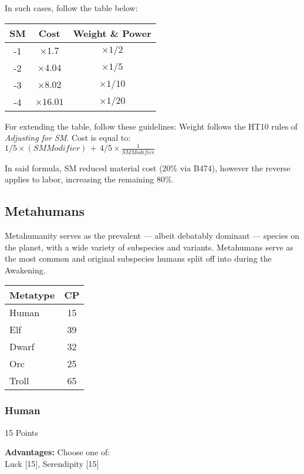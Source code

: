 \begin{multicols*}{3}
	In such cases, follow the table below:
	
	\begin{center}
		\begin{tabular}{|c|c|c|}
			\hline
			SM & Cost & Weight \& Power \\
			\hline
			\hline
			-1 & $\times1.7$ & $\times1/2$ \\
			-2 & $\times4.04$ & $\times1/5$ \\
			-3 & $\times8.02$ & $\times1/10$ \\
			-4 & $\times16.01$ & $\times1/20$ \\
			\hline
		\end{tabular}
	\end{center}

	For extending the table, follow these guidelines: Weight follows the HT10 rules of \textit{Adjusting for SM}. Cost is equal to:\\ $1/5\times(SM Modifier)\,+\,4/5\times\frac{1}{SM Modifier}$
	
	In said formula, SM reduced material cost (20\% via B474), however the reverse applies to labor, increasing the remaining 80\%.
	
	\subsection{Metahumans}
	
	Metahumanity serves as the prevalent — albeit debatably dominant — species on the planet, with a wide variety of subspecies and variants. Metahumans serve as the most common and original subspecies humans split off into during the Awakening.
	
	\begin{center}
		\begin{tabularx}{0.32\textwidth}{|X|c|}
			\hline
			Metatype & CP \\
			\hline
			\hline
			Human & 15 \\
			Elf & 39 \\
			Dwarf & 32 \\
			Orc & 25 \\
			Troll & 65 \\
			\hline
		\end{tabularx}
	\end{center}
	
	\subsubsection*{Human}
	\begin{flushright}
		15 Points
	\end{flushright}
	\textbf{Advantages:} 
	Choose one of: \\
	Luck [15], Serendipity [15]
	

\end{multicols*}
